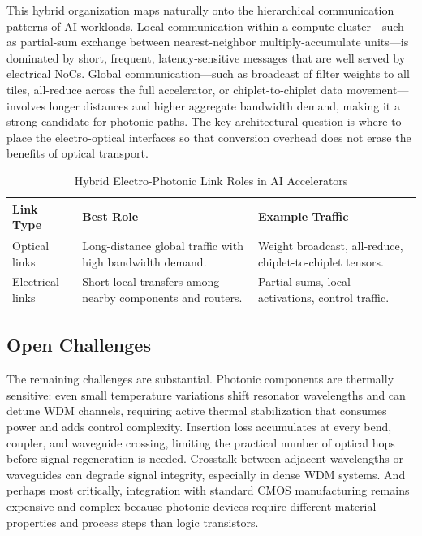 This hybrid organization maps naturally onto the hierarchical communication patterns of AI workloads. Local communication within a compute cluster---such as partial-sum exchange between nearest-neighbor multiply-accumulate units---is dominated by short, frequent, latency-sensitive messages that are well served by electrical NoCs. Global communication---such as broadcast of filter weights to all tiles, all-reduce across the full accelerator, or chiplet-to-chiplet data movement---involves longer distances and higher aggregate bandwidth demand, making it a strong candidate for photonic paths. The key architectural question is where to place the electro-optical interfaces so that conversion overhead does not erase the benefits of optical transport.

\begin{table}[!t]
\caption{Hybrid Electro-Photonic Link Roles in AI Accelerators}
\label{tab:photonic}
\centering
\footnotesize
\setlength{\tabcolsep}{3pt}
\renewcommand{\arraystretch}{1.08}
\begin{tabularx}{\columnwidth}{p{1.55cm}Y p{1.8cm}}
\toprule
Link Type & Best Role & Example Traffic \\
\midrule
Optical links & Long-distance global traffic with high bandwidth demand. & Weight broadcast, all-reduce, chiplet-to-chiplet tensors. \\
Electrical links & Short local transfers among nearby components and routers. & Partial sums, local activations, control traffic. \\
\bottomrule
\end{tabularx}
\end{table}

\subsection{Open Challenges}

The remaining challenges are substantial. Photonic components are thermally sensitive: even small temperature variations shift resonator wavelengths and can detune WDM channels, requiring active thermal stabilization that consumes power and adds control complexity. Insertion loss accumulates at every bend, coupler, and waveguide crossing, limiting the practical number of optical hops before signal regeneration is needed. Crosstalk between adjacent wavelengths or waveguides can degrade signal integrity, especially in dense WDM systems. And perhaps most critically, integration with standard CMOS manufacturing remains expensive and complex because photonic devices require different material properties and process steps than logic transistors.

